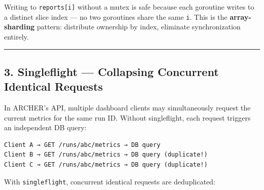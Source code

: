 \documentclass[
]{article}
\begin{document}
Writing to \texttt{reports{[}i{]}} without a mutex is safe because each
goroutine writes to a distinct slice index --- no two goroutines share
the same \texttt{i}. This is the \textbf{array-sharding} pattern:
distribute ownership by index, eliminate synchronization entirely.

\begin{center}\rule{0.5\linewidth}{0.5pt}\end{center}

\hypertarget{singleflight-collapsing-concurrent-identical-requests}{%
\subsection{3. Singleflight --- Collapsing Concurrent Identical
Requests}\label{singleflight-collapsing-concurrent-identical-requests}}

In ARCHER's API, multiple dashboard clients may simultaneously request
the current metrics for the same run ID. Without singleflight, each
request triggers an independent DB query:

\begin{verbatim}
Client A → GET /runs/abc/metrics → DB query
Client B → GET /runs/abc/metrics → DB query (duplicate!)
Client C → GET /runs/abc/metrics → DB query (duplicate!)
\end{verbatim}

With \texttt{singleflight}, concurrent identical requests are
deduplicated:
\end{document}
